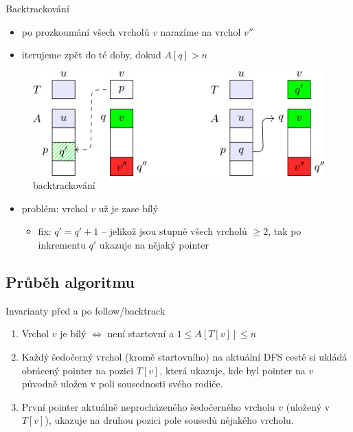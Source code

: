 \documentclass[czech]{beamer}
\begin{document}
	\begin{frame}{Backtrackování}
		\begin{itemize}
			\item po prozkoumání všech vrcholů $v$ narazíme na vrchol $v''$
			\item iterujeme zpět do té doby, dokud $A[q] > n$
		\end{itemize}

		\begin{figure}
			\centering
			\includegraphics{images/deg2-fix.png}
			\caption{backtrackování}
		\end{figure}
		\begin{itemize}
			\item problém: vrchol $v$ už je zase bílý
			\begin{itemize}
				\item fix: $q' = q' + 1$ -- jelikož jsou stupně všech vrcholů $\ge 2$, tak po inkrementu $q'$ ukazuje na nějaký pointer
			\end{itemize}
		\end{itemize}
	\end{frame}
		
	\subsection{Průběh algoritmu}

	\begin{frame}{Invarianty před a po follow/backtrack}
		\begin{enumerate}
				\item Vrchol $v$ je bílý $\iff$ není startovní a $1 \le A[T[v]] \le n$
				\item Každý šedočerný vrchol (kromě startovního) na aktuální DFS cestě si ukládá obrácený pointer na pozici $T[v]$, která ukazuje, kde byl pointer na $v$ původně uložen v poli sousednosti svého rodiče.
				\item První pointer aktuálně neprocházeného šedočerného vrcholu $v$ (uložený v $T[v]$), ukazuje na druhou pozici pole sousedů nějakého vrcholu.
		\end{enumerate}
	\end{frame}
\end{document}
